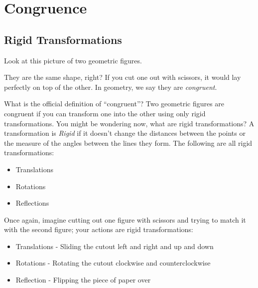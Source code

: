 \chapter{Congruence}
\section{Rigid Transformations}

Look at this picture of two geometric figures.


They are the same shape, right? If you cut one out with scissors, it
would lay perfectly on top of the other. In geometry, we say they are
\emph{congruent}.

What is the official definition of ``congruent''? 
Two geometric figures are congruent if you can transform one into the other using
only rigid transformations. 
You might be wondering now, what are rigid transformations?
A transformation is \emph{Rigid} if it doesn't change the distances
between the points or the measure of the angles between the lines they
form. The following are all rigid transformations:
\begin{itemize}
\item Translations
\item Rotations
\item Reflections 
\end{itemize}

Once again, imagine cutting out one figure with scissors and trying to match it with the second figure; your actions are rigid transformations:
\begin{itemize}
\item Translations - Sliding the cutout left and right and up and down
\item Rotations	- Rotating the cutout clockwise and counterclockwise
\item Reflection - Flipping the piece of paper over
\end{itemize}


